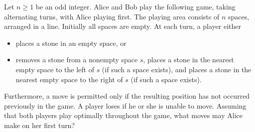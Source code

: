 Let $n \geq 1$ be an odd integer. Alice and Bob play the following game,
taking alternating turns, with Alice playing first. 
The playing area consists of $n$ spaces, arranged in a line.
Initially all spaces are empty.
At each turn, a player either
\begin{itemize}
\item
places a stone in an empty space, or
\item
removes a stone from a nonempty space $s$, 
places a stone in the nearest empty space to the left of $s$
(if such a space exists),
and places a stone in the nearest empty space to the right of $s$
(if such a space exists).
\end{itemize}
Furthermore, a move is permitted only if the resulting position has not occurred previously in the game. A player loses if he or she is unable to move. Assuming that both players play optimally throughout the game, what moves may Alice make on her first turn?